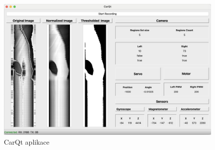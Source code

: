 \begin{figure}[!h]
    \centering
    \includegraphics[width = .95\linewidth]{Figures/CarQt.png}
    \caption{CarQt aplikace}
    \label{fig:CarQt}
\end{figure}

\endinput
